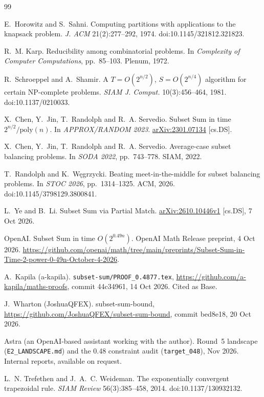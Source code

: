 \documentclass[11pt]{article}
\theoremstyle{plain}
\begin{document}
\begin{thebibliography}{99}

E.~Horowitz and S.~Sahni. Computing partitions with applications to the knapsack problem. \emph{J. ACM} 21(2):277--292, 1974. doi:10.1145/321812.321823.

R.~M. Karp. Reducibility among combinatorial problems. In \emph{Complexity of Computer Computations}, pp.~85--103. Plenum, 1972.

R.~Schroeppel and A.~Shamir. A $T = O(2^{n/2})$, $S = O(2^{n/4})$ algorithm for certain NP-complete problems. \emph{SIAM J. Comput.} 10(3):456--464, 1981. doi:10.1137/0210033.

X.~Chen, Y.~Jin, T.~Randolph and R.~A. Servedio. Subset Sum in time $2^{n/2}/\mathrm{poly}(n)$. In \emph{APPROX/RANDOM 2023}. \href{https://arxiv.org/abs/2301.07134}{arXiv:2301.07134} [cs.DS].

X.~Chen, Y.~Jin, T.~Randolph and R.~A. Servedio. Average-case subset balancing problems. In \emph{SODA 2022}, pp.~743--778. SIAM, 2022.

T.~Randolph and K.~W\k{e}grzycki. Beating meet-in-the-middle for subset balancing problems. In \emph{STOC 2026}, pp.~1314--1325. ACM, 2026. doi:10.1145/3798129.3800841.

L.~Ye and B.~Li. Subset Sum via Partial Match. \href{https://arxiv.org/abs/2610.10446v1}{arXiv:2610.10446v1} [cs.DS], 7 Oct 2026.

OpenAI. Subset Sum in time $O(2^{0.49n})$. OpenAI Math Release preprint, 4 Oct 2026. \url{https://github.com/openai/math/tree/main/preprints/Subset-Sum-in-Time-2-power-0-49n-October-4-2026}.

A.~Kapila (a-kapila). \texttt{subset-sum/PROOF\_0.4877.tex}, \url{https://github.com/a-kapila/maths-proofs}, commit 44c34961, 14 Oct 2026. Cited as Base.

J.~Wharton (JoshuaQFEX). subset-sum-bound, \url{https://github.com/JoshuaQFEX/subset-sum-bound}, commit bed8e18, 20 Oct 2026.

Astra (an OpenAI-based assistant working with the author). Round~5 landscape (\texttt{E2\_LANDSCAPE.md}) and the 0.48 constraint audit (\texttt{target\_048}), Nov 2026. Internal reports, available on request.

L.~N. Trefethen and J.~A.~C. Weideman. The exponentially convergent trapezoidal rule. \emph{SIAM Review} 56(3):385--458, 2014. doi:10.1137/130932132.


\end{thebibliography}
\end{document}
